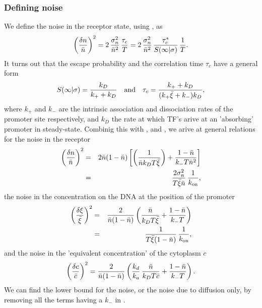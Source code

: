 \subsubsection{Defining noise}
We define the noise in the receptor state, using , as
\begin{equation}
 \left( \frac{\delta n}{\bar{n}} \right)^2 = 2 \, \frac{\sigma_n^2}{\bar{n}^2} \, \frac{\tau_c}{T} = 2 \, \frac{\sigma_n^2}{\bar{n}^2} \, \frac{\tau_c^*}{S(\infty|\sigma)} \, \frac{1}{T}.
 \elabel{EqProNoise}
\end{equation}
It turns out that the escape probability and the correlation time $\tau_c$ have a general form
\begin{equation}
 S(\infty|\sigma) = \frac{k_D}{k_+ + k_D} \quad {\rm and} \quad \tau_c = \frac{k_+ + k_D}{(k_+ \bar{\xi} + k_-) k_D},
 \elabel{Sinfty}
\end{equation}
where $k_+$ and $k_-$ are the intrinsic association and dissociation rates of the promoter site respectively, and $k_D$ the rate at which TF's arive at an 'absorbing' promoter in steady-state. Combinig this with ,  and , we arive at general relations for the noise in the receptor
\begin{eqnarray}
 \elabel{NoisePro}
 \left( \frac{\delta n}{\bar{n}} \right)^2 & = & 2 \bar{n}(1-\bar{n})\left[\left( \frac{1}{\bar{n} k_D T \bar{\xi}} \right)+\frac{1-\bar{n}}{k_- T \bar{n}^2} \right] \\
 & = & \frac{2 \sigma_n^2}{T \bar{\xi} \bar{n}} \, \frac{1}{k_{\rm on}},
\end{eqnarray}
the noise in the concentration on the DNA at the position of the promoter
\begin{eqnarray}
 \elabel{NoiseXi}
 \left( \frac{\delta \xi}{\bar{\xi}} \right)^2 & = & \frac{2}{\bar{n}(1-\bar{n})} \left( \frac{\bar{n}}{k_D T \bar{\xi}} + \frac{1-\bar{n}}{k_- T}  \right) \\
  & = & \frac{1}{T \bar{\xi} (1 - \bar{n})} \, \frac{1}{k_{\rm on}},
\end{eqnarray}
and the noise in the 'equivalent concentration' of the cytoplasm $c$
\begin{equation}
 \elabel{NoiseC} 
 \left( \frac{\delta c}{\bar{c}} \right)^2 = \frac{2}{\bar{n}(1-\bar{n})} \left( \frac{k_d}{k_a} \, \frac{\bar{n}}{k_D T \bar{c}} + \frac{1-\bar{n}}{k_- T}  \right).
\end{equation}
We can find the lower bound for the noise, or the noise due to diffusion only, by removing all the terms having a $k_-$ in . 

